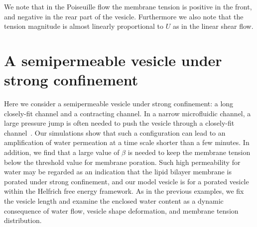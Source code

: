 \documentclass[prb,preprint,showpacs,preprintnumbers,amsmath,amssymb,longbibliography]{revtex4-1}
\begin{document}
We note that in the Poiseuille flow the membrane tension is positive in
the front, and negative in the rear part of the vesicle. Furthermore we
also note that the tension magnitude is almost linearly proportional to
$U$ as in the linear shear flow.


\section{A semipermeable vesicle under strong confinement\label{sec:confinement}}
Here we consider a semipermeable vesicle under strong confinement: a
long closely-fit channel and a contracting channel. In a narrow
microfluidic channel, a large pressure jump is often needed to push the
vesicle through a closely-fit channel~\cite{abk-fai-sto2006}.  Our
simulations show that such a configuration can lead to an amplification
of water permeation at a time scale shorter than a few minutes. In
addition, we find that a large value of $\beta$ is needed to keep the
membrane tension below the threshold value for membrane poration. Such
high permeability for water may be regarded as an indication that the
lipid bilayer membrane is porated under strong confinement, and our
model vesicle is for a porated vesicle within the Helfrich free energy
framework.  As in the previous examples, we fix the vesicle length and
examine the enclosed water content as a dynamic consequence of water
flow, vesicle shape deformation, and membrane tension distribution.


\end{document}
